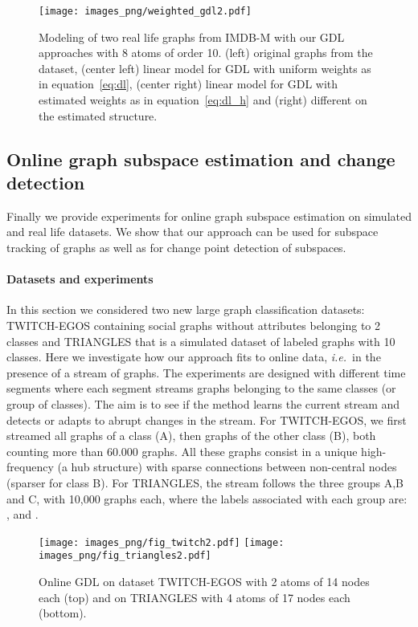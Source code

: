 \documentclass{article}
\def\eqref#1{equation~\ref{#1}}
\newcommand{\ie}{\textit{i.e.}}
\begin{document}
	\begin{figure}[t]
		\centering
		\texttt{[image: images\_png/weighted\_gdl2.pdf]}\vspace{-1mm}
		\caption{Modeling of two real life graphs from IMDB-M with our GDL
			approaches with 8 atoms of order 10. (left) original graphs 	from the dataset, (center left) linear model for GDL with uniform
			weights as in \eqref{eq:dl}, (center right) linear model for GDL with estimated
			weights  as in \eqref{eq:dl_h} and (right) different  on the
			estimated structure. }  \label{fig:unmix_weights}
	\end{figure}
\subsection{Online graph subspace estimation and change detection}\label{subsec:real2}
	
	Finally we provide experiments for online graph subspace estimation on simulated
	and real life datasets. We show that our approach can be used for subspace
	tracking of graphs as well as for change point detection of subspaces. 
	
	\paragraph{Datasets and experiments} In this section we considered two new large graph
	classification datasets: TWITCH-EGOS \citep{karateclub} containing social graphs without
	attributes belonging to 2 classes and TRIANGLES
	\citep{knyazev2019understanding} that is a simulated dataset of labeled graphs
	with 10 classes. Here we investigate how our approach fits to online data, \ie\ in the presence of a stream of graphs. The experiments are designed with
	different time segments where each segment streams graphs belonging to the same
	classes (or group of classes). The aim is to see if the method learns the current
	stream and detects or adapts to abrupt changes in the stream. For TWITCH-EGOS, we first streamed all graphs of a class (A), then graphs of the
	other class (B), both counting more than 60.000 graphs. All these graphs consist in a unique high-frequency (a hub structure) with sparse connections between non-central nodes (sparser for class B).  For TRIANGLES, the 
	stream follows the three
	groups A,B and C, with 10,000 graphs each, where  the labels  associated with each group are:
	,  and .
	
	\begin{figure}[t]
		\centering
		\hspace{-2mm}\texttt{[image: images\_png/fig\_twitch2.pdf]}
\texttt{[image: images\_png/fig\_triangles2.pdf]}\vspace{-4mm}
		\caption{Online GDL on dataset TWITCH-EGOS with 2 atoms of
			14 nodes each (top) and on TRIANGLES with 4 atoms of 17 nodes each (bottom).} \label{fig:online}
	\end{figure}
	
\end{document}
